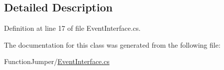 \subsection{Detailed Description}


Definition at line 17 of file Event\+Interface.\+cs.



The documentation for this class was generated from the following file\+:\begin{DoxyCompactItemize}
\item 
Function\+Jumper/\hyperlink{_event_interface_8cs}{Event\+Interface.\+cs}\end{DoxyCompactItemize}
